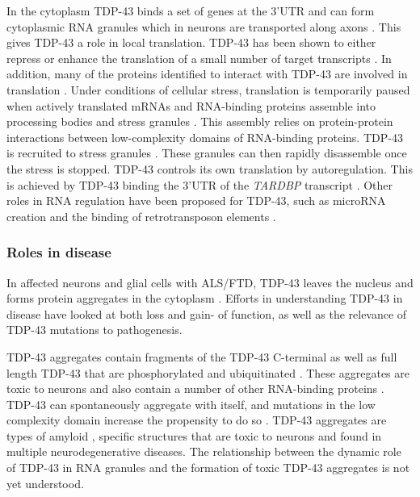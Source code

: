 In the cytoplasm TDP-43 binds a set of genes at the 3'UTR \citep{Colombrita2012} and can form cytoplasmic RNA granules which in neurons are transported along axons \citep{Alami2013, Fallini2012}. This gives TDP-43 a role in local translation.
TDP-43 has been shown to either repress or enhance the translation of a small number of target transcripts \citep{Majumder2012, Majumder2016, Neelagandan2018}.
In addition, many of the proteins identified to interact with TDP-43 are involved in translation \citep{Freibaum2010-hw}.
Under conditions of cellular stress, translation is temporarily paused when actively translated mRNAs and RNA-binding proteins assemble into processing bodies and stress granules \citep{Anderson2008}. 
This assembly relies on protein-protein interactions between low-complexity domains of RNA-binding proteins.
TDP-43 is recruited to  stress granules \citep{Colombrita2009}.
These granules can then rapidly disassemble once the stress is stopped.
TDP-43 controls its own translation by autoregulation.
This is achieved by TDP-43 binding the 3'UTR of the \textit{TARDBP} transcript \citep{Ayala2011,Koyama2016}. 
Other roles in RNA regulation have been proposed for TDP-43, such as microRNA creation \citep{Kawahara2012} and the binding of retrotransposon elements \citep{Li2012,Zarnack2013,Kelley2014}.



\subsubsection{Roles in disease}

In affected neurons and glial cells with ALS/FTD, TDP-43 leaves the nucleus and forms protein aggregates in the cytoplasm \citep{Neumann2006}. 
Efforts in understanding TDP-43 in disease have looked at both loss and gain- of function, as well as the relevance of TDP-43 mutations to pathogenesis.

TDP-43 aggregates contain fragments of the TDP-43 C-terminal as well as full length TDP-43 that are phosphorylated and ubiquitinated \citep{Neumann2006,Arai2006, Bosque2013, Hasegawa2008}.
These aggregates are toxic to neurons  \citep{Zhang2009} and also contain a number of other RNA-binding proteins \citep{Dammer2012}.
TDP-43 can spontaneously aggregate with itself, and mutations in the low complexity domain increase the propensity to do so \citep{Johnson2009}.
TDP-43 aggregates are types of amyloid \citep{Fang2014}, specific structures that are toxic to neurons and found in multiple neurodegenerative diseases.
The relationship between the dynamic role of TDP-43 in RNA granules and the formation of toxic TDP-43 aggregates is not yet understood.


